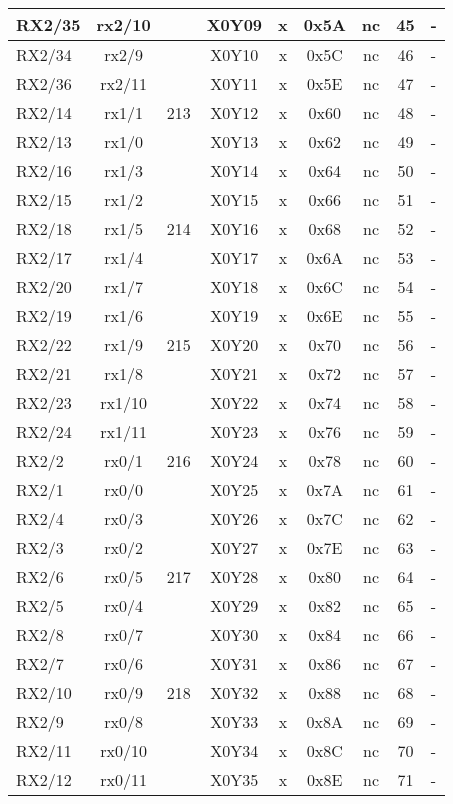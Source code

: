 \begin{longtable}{|l|c|c|c|c|c|c|c|l|}
RX2/35 & rx2/10 &     & X0Y09 &  x  & 0x5A & nc & 45 & -\\\hline   
RX2/34 & rx2/9  &     & X0Y10 &  x  & 0x5C & nc & 46 & -\\\hline   
RX2/36 & rx2/11 &     & X0Y11 &  x  & 0x5E & nc & 47 & -\\\hline   
RX2/14 & rx1/1  & 213 & X0Y12 &  x  & 0x60 & nc & 48 & -\\\hline   
RX2/13 & rx1/0  &     & X0Y13 &  x  & 0x62 & nc & 49 & -\\\hline   
RX2/16 & rx1/3  &     & X0Y14 &  x  & 0x64 & nc & 50 & -\\\hline   
RX2/15 & rx1/2  &     & X0Y15 &  x  & 0x66 & nc & 51 & -\\\hline   
RX2/18 & rx1/5  & 214 & X0Y16 &  x  & 0x68 & nc & 52 & -\\\hline   
RX2/17 & rx1/4  &     & X0Y17 &  x  & 0x6A & nc & 53 & -\\\hline   
RX2/20 & rx1/7  &     & X0Y18 &  x  & 0x6C & nc & 54 & -\\\hline   
RX2/19 & rx1/6  &     & X0Y19 &  x  & 0x6E & nc & 55 & -\\\hline   
RX2/22 & rx1/9  & 215 & X0Y20 &  x  & 0x70 & nc & 56 & -\\\hline   
RX2/21 & rx1/8  &     & X0Y21 &  x  & 0x72 & nc & 57 & -\\\hline   
RX2/23 & rx1/10 &     & X0Y22 &  x  & 0x74 & nc & 58 & -\\\hline   
RX2/24 & rx1/11 &     & X0Y23 &  x  & 0x76 & nc & 59 & -\\\hline   
RX2/2  & rx0/1  & 216 & X0Y24 &  x  & 0x78 & nc & 60 & -\\\hline   
RX2/1  & rx0/0  &     & X0Y25 &  x  & 0x7A & nc & 61 & -\\\hline   
RX2/4  & rx0/3  &     & X0Y26 &  x  & 0x7C & nc & 62 & -\\\hline   
RX2/3  & rx0/2  &     & X0Y27 &  x  & 0x7E & nc & 63 & -\\\hline   
RX2/6  & rx0/5  & 217 & X0Y28 &  x  & 0x80 & nc & 64 & -\\\hline   
RX2/5  & rx0/4  &     & X0Y29 &  x  & 0x82 & nc & 65 & -\\\hline   
RX2/8  & rx0/7  &     & X0Y30 &  x  & 0x84 & nc & 66 & -\\\hline   
RX2/7  & rx0/6  &     & X0Y31 &  x  & 0x86 & nc & 67 & -\\\hline   
RX2/10 & rx0/9  & 218 & X0Y32 &  x  & 0x88 & nc & 68 & -\\\hline   
RX2/9  & rx0/8  &     & X0Y33 &  x  & 0x8A & nc & 69 & -\\\hline   
RX2/11 & rx0/10 &     & X0Y34 &  x  & 0x8C & nc & 70 & -\\\hline   
RX2/12 & rx0/11 &     & X0Y35 &  x  & 0x8E & nc & 71 & -\\\hline   
\end{longtable}                  

